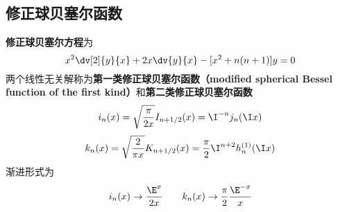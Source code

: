\subsection{修正球贝塞尔函数}

\textbf{修正球贝塞尔方程}为
\begin{equation}
x^2 \dv[2]{y}{x} + 2x\dv{y}{x} - [x^2 + n(n + 1)]y = 0
\end{equation}
两个线性无关解称为\textbf{第一类修正球贝塞尔函数（modified spherical Bessel function of the first kind）}和\textbf{第二类修正球贝塞尔函数}
\begin{equation}
i_n(x) = \sqrt{\frac{\pi }{2x}} I_{n+1/2}(x) = \I^{-n} j_n(\I x)
\end{equation}
\begin{equation}\label{SphBsl_eq1}
k_n(x) = \sqrt{\frac{2}{\pi x}} K_{n+1/2}(x) = \frac{\pi }{2} \I^{n + 2} h_n^{(1)}(\I x)
\end{equation}
渐进形式为
\begin{equation}
i_n(x) \to \frac{\E^x}{2x}
\qquad
k_n(x) \to \frac{\pi}{2} \frac{\E^{-x}}{x}
\end{equation}
